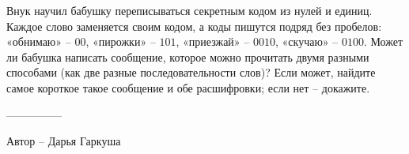 \question
Внук научил бабушку переписываться секретным кодом из нулей и единиц. Каждое слово заменяется своим кодом, а коды пишутся подряд без пробелов: «обнимаю» -- $00$, «пирожки» -- $101$, «приезжай» -- $0010$, «скучаю» -- $0100$. Может ли бабушка написать сообщение, которое можно прочитать двумя разными способами (как две разные последовательности слов)? Если может, найдите самое короткое такое сообщение и обе расшифровки; если нет -- докажите.

---------------

Автор -- Дарья Гаркуша